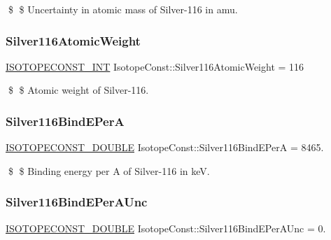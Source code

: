 \$ \$ Uncertainty in atomic mass of Silver-\/116 in amu. \mbox{\label{group___isotope_const-_silver-_ag116_gae07e5c01fdd92287cbb2d7019f26db16}} 
\subsubsection{\texorpdfstring{Silver116\+Atomic\+Weight}{Silver116AtomicWeight}}
{\footnotesize\ttfamily \mbox{\hyperlink{group___isotope_const-_macros_ga5f18360b3e99483a35c32d789e62621c}{I\+S\+O\+T\+O\+P\+E\+C\+O\+N\+S\+T\+\_\+\+I\+NT}} Isotope\+Const\+::\+Silver116\+Atomic\+Weight = 116}

\$ \$ Atomic weight of Silver-\/116. \mbox{\label{group___isotope_const-_silver-_ag116_ga65da00cd9dc3c7b99c81848c13e752c0}} 
\subsubsection{\texorpdfstring{Silver116\+Bind\+E\+PerA}{Silver116BindEPerA}}
{\footnotesize\ttfamily \mbox{\hyperlink{group___isotope_const-_macros_ga8f45a7272ce02c0b4c65c44636ed719a}{I\+S\+O\+T\+O\+P\+E\+C\+O\+N\+S\+T\+\_\+\+D\+O\+U\+B\+LE}} Isotope\+Const\+::\+Silver116\+Bind\+E\+PerA = 8465.}

\$ \$ Binding energy per A of Silver-\/116 in keV. \mbox{\label{group___isotope_const-_silver-_ag116_ga3adbad2fedf5f122739e58149c8028cc}} 
\subsubsection{\texorpdfstring{Silver116\+Bind\+E\+Per\+A\+Unc}{Silver116BindEPerAUnc}}
{\footnotesize\ttfamily \mbox{\hyperlink{group___isotope_const-_macros_ga8f45a7272ce02c0b4c65c44636ed719a}{I\+S\+O\+T\+O\+P\+E\+C\+O\+N\+S\+T\+\_\+\+D\+O\+U\+B\+LE}} Isotope\+Const\+::\+Silver116\+Bind\+E\+Per\+A\+Unc = 0.}

